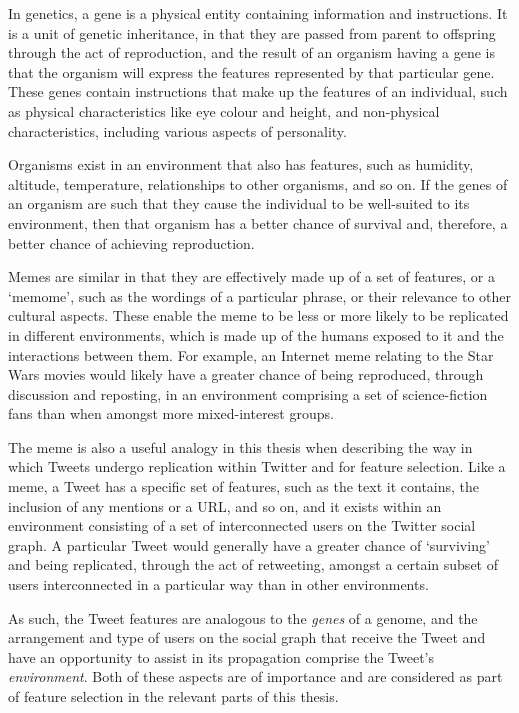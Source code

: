 In genetics, a gene is a physical entity containing information and instructions. It is a unit of genetic inheritance, in that they are passed from parent to offspring through the act of reproduction, and the result of an organism having a gene is that the organism will express the features represented by that particular gene. These genes contain instructions that make up the features of an individual, such as physical characteristics like eye colour and height, and non-physical characteristics, including various aspects of personality.

Organisms exist in an environment that also has features, such as humidity, altitude, temperature, relationships to other organisms, and so on. If the genes of an organism are such that they cause the individual to be well-suited to its environment, then that organism has a better chance of survival and, therefore, a better chance of achieving reproduction.

Memes are similar in that they are effectively made up of a set of features, or a `memome', such as the wordings of a particular phrase, or their relevance to other cultural aspects. These enable the meme to be less or more likely to be replicated in different environments, which is made up of the humans exposed to it and the interactions between them. For example, an Internet meme relating to the Star Wars movies would likely have a greater chance of being reproduced, through discussion and reposting, in an environment comprising a set of science-fiction fans than when amongst more mixed-interest groups.

The meme is also a useful analogy in this thesis when describing the way in which Tweets undergo replication within Twitter and for feature selection. Like a meme, a Tweet has a specific set of features, such as the text it contains, the inclusion of any mentions or a URL, and so on, and it exists within an environment consisting of a set of interconnected users on the Twitter social graph. A particular Tweet would generally have a greater chance of `surviving' and being replicated, through the act of retweeting, amongst a certain subset of users interconnected in a particular way than in other environments.

As such, the Tweet features are analogous to the \textit{genes} of a genome, and the arrangement and type of users on the social graph that receive the Tweet and have an opportunity to assist in its propagation comprise the Tweet's \textit{environment}. Both of these aspects are of importance and are considered as part of feature selection in the relevant parts of this thesis.


